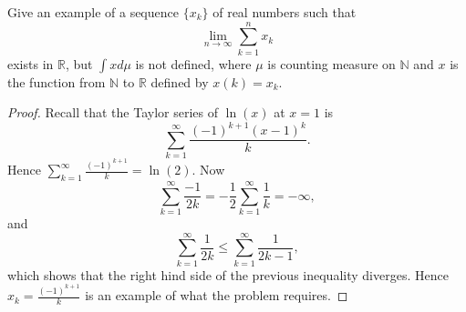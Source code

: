 \documentclass[14.5pt]{article}
\newcommand{\N}{\mathbb{N}}
\newcommand{\R}{\mathbb{R}}
\newenvironment{problem}[2][Problem]{\begin{mdframed}[backgroundcolor=gray!10, leftline = false, rightline=false, linewidth=0.25pt]  \begin{trivlist}
\item[\hskip \labelsep {\bfseries #1}\hskip \labelsep {\bfseries #2.}]}{\end{trivlist} \end{mdframed}  }
\begin{document}
\begin{problem}{3A.18} Give an example of a sequence $\{x_k\}$ of real numbers such that 
$$ \lim_{n \to \infty } \sum_{k=1}^{n} x_k$$
exists in $\R$, but $\int x d\mu $ is not defined, where $\mu$ is counting measure on $\N$ and $x$ is the function from $\N$ to $\R$ defined by $x(k) = x_k$.
\end{problem}
\begin{proof}
Recall that the Taylor series of $\ln(x)$ at $x = 1$ is 
$$\sum_{k=1}^{\infty} \frac{(-1)^{k + 1}(x-1)^{k} }{k}.$$
Hence $\sum_{k=1}^{\infty} \frac{(-1)^{k + 1}}{k} = \ln(2)$. Now
$$\sum_{k=1}^\infty \frac{-1}{2k} = - \frac{1}{2} \sum_{k=1}^\infty \frac{1}{k} = -\infty,$$
and $$\sum_{k=1}^\infty \frac{1}{2k} \leq \sum_{k=1}^\infty \frac{1}{2k-1}, $$
which shows that the right hind side of the previous inequality diverges. Hence $x_k = \frac{(-1)^{k + 1}}{k}$ is an example of what the problem requires. 
\end{proof}
\end{document}

